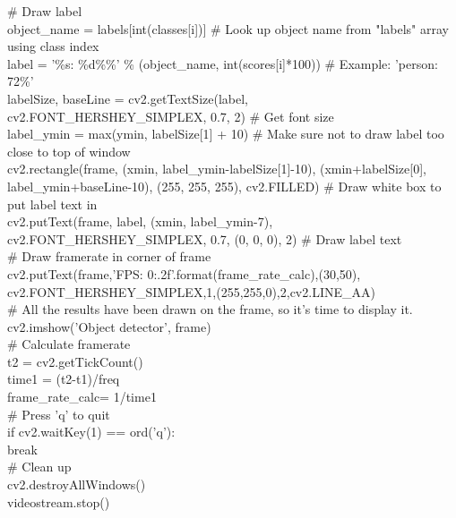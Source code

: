             \# Draw label\\
            object\_name = labels[int(classes[i])] \# Look up object name from "labels" array using class index\\
            label = '\%s: \%d\%\%' \% (object\_name, int(scores[i]*100)) \# Example: 'person: 72\%'\\
            labelSize, baseLine = cv2.getTextSize(label,\\
            cv2.FONT\_HERSHEY\_SIMPLEX, 0.7, 2) \# Get font size\\
            label\_ymin = max(ymin, labelSize[1] + 10) \# Make sure not to draw label too close to top of window\\
            cv2.rectangle(frame, (xmin, label\_ymin-labelSize[1]-10), (xmin+labelSize[0], label\_ymin+baseLine-10), (255, 255, 255), cv2.FILLED) \# Draw white box to put label text in\\
            cv2.putText(frame, label, (xmin, label\_ymin-7),\\
            cv2.FONT\_HERSHEY\_SIMPLEX, 0.7, (0, 0, 0), 2) \# Draw label text\\

    \# Draw framerate in corner of frame\\
    cv2.putText(frame,'FPS: {0:.2f}'.format(frame\_rate\_calc),(30,50),\\
    cv2.FONT\_HERSHEY\_SIMPLEX,1,(255,255,0),2,cv2.LINE\_AA)\\

    \# All the results have been drawn on the frame, so it's time to display it.\\
    cv2.imshow('Object detector', frame)\\

    \# Calculate framerate\\
    t2 = cv2.getTickCount()\\
    time1 = (t2-t1)/freq\\
    frame\_rate\_calc= 1/time1\\

    \# Press 'q' to quit\\
    if cv2.waitKey(1) == ord('q'):\\
        break\\

\# Clean up\\
cv2.destroyAllWindows()\\
videostream.stop()\\
